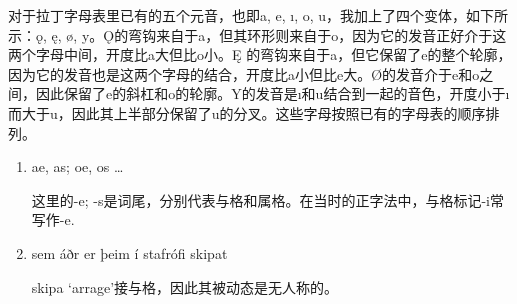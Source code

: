 \begin{translation*}{}
    对于拉丁字母表里已有的五个元音，也即a, e, ı, o, u，我加上了四个变体，如下所示：ǫ, ę, ø, y。Ǫ的弯钩来自于a，但其环形则来自于o，因为它的发音正好介于这两个字母中间，开度比a大但比o小。Ę 的弯钩来自于a，但它保留了e的整个轮廓，因为它的发音也是这两个字母的结合，开度比a小但比e大。Ø的发音介于e和o之间，因此保留了e的斜杠和o的轮廓。Y的发音是ı和u结合到一起的音色，开度小于ı而大于u，因此其上半部分保留了u的分叉。这些字母按照已有的字母表的顺序排列。
\end{translation*}
\begin{grammar*}{}
    \begin{enumerate}[leftmargin=*]
        \item ae, as; oe, os {\dots}

              这里的-e; -s是词尾，分别代表与格和属格。在当时的正字法中，与格标记-i常写作-e.

        \item sem áðr er þeim í stafrófi skipat

              skipa `arrage'接与格，因此其被动态是无人称的。
    \end{enumerate}
\end{grammar*}
